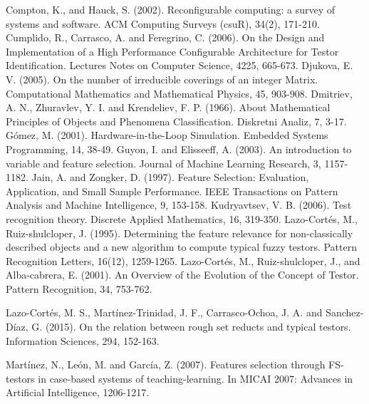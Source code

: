 \documentclass[authoryear,preprint,review,12pt]{elsarticle}
\begin{document}

\begin{thebibliography}{00}

Compton, K., and Hauck, S. (2002). Reconfigurable computing: a survey of systems and software. ACM Computing Surveys (csuR), 34(2), 171-210.
 Cumplido, R., Carrasco, A. and Feregrino, C. (2006). On the Design and Implementation of a High Performance Configurable Architecture for Testor Identification. Lectures Notes on Computer Science, 4225, 665-673.
Djukova, E. V. (2005). On the number of irreducible coverings of an integer Matrix. Computational Mathematics and Mathematical Physics, 45, 903-908.
 Dmitriev, A. N.,  Zhuravlev, Y. I. and Krendeliev, F. P. (1966). About Mathematical Principles of Objects and Phenomena Classification. Diskretni Analiz, 7, 3-17.
G\'omez, M. (2001). Hardware-in-the-Loop Simulation. Embedded Systems Programming, 14, 38-49.
Guyon, I. and Elisseeff, A. (2003). An introduction to variable and feature selection. Journal of Machine Learning Research, 3, 1157-1182.
Jain, A. and Zongker, D. (1997). Feature Selection: Evaluation, Application, and Small Sample Performance. IEEE Transactions on Pattern Analysis and Machine Intelligence, 9, 153-158.
Kudryavtsev, V. B. (2006). Test recognition theory. Discrete Applied Mathematics, 16, 319-350.
Lazo-Cort\'es, M., Ruiz-shulcloper, J. (1995). Determining the feature relevance for non-classically described objects and a new algorithm to compute typical fuzzy testors. Pattern Recognition Letters, 16(12), 1259-1265.
Lazo-Cort\'es, M., Ruiz-shulcloper, J., and Alba-cabrera, E. (2001). An Overview of the Evolution of the Concept of Testor. Pattern Recognition, 34, 753-762.

Lazo-Cortés, M. S., Mart\'inez-Trinidad, J. F., Carrasco-Ochoa, J. A. and Sanchez-D\'iaz, G. (2015). On the relation between rough set reducts and typical testors. Information Sciences, 294, 152-163.

Mart\'inez, N., Le\'on, M. and Garc\'ia, Z. (2007). Features selection through FS-testors in case-based systems of teaching-learning. In MICAI 2007: Advances in Artificial Intelligence, 1206-1217.


\end{thebibliography}
\end{document}
